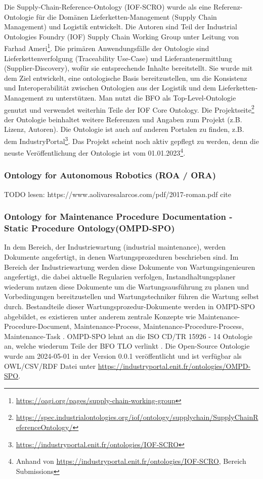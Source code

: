 \documentclass{article}
\begin{document}
Die Supply-Chain-Reference-Ontology (IOF-SCRO) wurde als eine Referenz-Ontologie für die Domänen Lieferketten-Management (Supply Chain Management) und Logistik entwickelt\cite{ameri2020towards}.
Die Autoren sind Teil der Industrial Ontologies Foundry (IOF) Supply Chain Working Group unter Leitung von Farhad Ameri\footnote{\url{https://oagi.org/pages/supply-chain-working-group}}.
Die primären Anwendungsfälle der Ontologie sind Lieferkettenverfolgung (Traceability Use-Case) und Lieferantenermittlung (Supplier-Discovery), wofür sie entsprechende Inhalte bereitstellt.
Sie wurde mit dem Ziel entwickelt, eine ontologische Basis bereitzustellen, um die Konsistenz und Interoperabilität zwischen Ontologien aus der Logistik und dem Lieferketten-Management zu unterstützen.
Man nutzt die BFO als Top-Level-Ontologie genutzt und verwendet weiterhin Teile der IOF Core Ontology\cite{Kulvatunyou2022}.
Die Projektseite\footnote{\url{https://spec.industrialontologies.org/iof/ontology/supplychain/SupplyChainReferenceOntology/}} der Ontologie beinhaltet weitere Referenzen und Angaben zum Projekt (z.B. Lizenz, Autoren).
Die Ontologie ist auch auf anderen Portalen zu finden, z.B. dem IndustryPortal\footnote{\url{https://industryportal.enit.fr/ontologies/IOF-SCRO}}.
Das Projekt scheint noch aktiv gepflegt zu werden, denn die neuste Veröffentlichung der Ontologie ist vom 01.01.2023\footnote{Anhand von \url{https://industryportal.enit.fr/ontologies/IOF-SCRO}, Bereich Submissions}.

\subsubsection{Ontology for Autonomous Robotics (ROA / ORA)}

TODO lesen: https://www.aolivaresalarcos.com/pdf/2017-roman.pdf
cite \cite{olszewska2017ontology}

\subsubsection{Ontology for Maintenance Procedure Documentation - Static Procedure Ontology(OMPD-SPO)}
In dem Bereich, der Industriewartung (industrial maintenance), werden Dokumente angefertigt, in denen  Wartungsprozeduren beschrieben sind. Im Bereich der Industriewartung werden diese Dokumente von Wartungsingenieuren angefertigt, die dabei aktuelle Regularien verfolgen, Instandhaltungsplaner wiederum nutzen diese Dokumente um die Wartungsausführung zu planen und Vorbedingungen bereitzustellen und Wartungstechniker führen die Wartung selbst durch. Bestandteile dieser Wartungsprozedur-Dokumente werden in OMPD-SPO abgebildet, es existieren unter anderem zentrale Konzepte wie  Maintenance-Procedure-Document, Maintenance-Process, Maintenance-Procedure-Process, Maintenance-Task \cite{woods2023ontology}.
OMPD-SPO lehnt an die ISO CD/TR 15926 - 14  Ontologie an, welche wiederum Teile der BFO TLO verlinkt \cite{woods2023ontology}.
Die Open-Source Ontologie wurde am 2024-05-01 in der Version 0.0.1 veröffentlicht  und ist verfügbar als OWL/CSV/RDF Datei unter \url{https://industryportal.enit.fr/ontologies/OMPD-SPO}.
\end{document}
